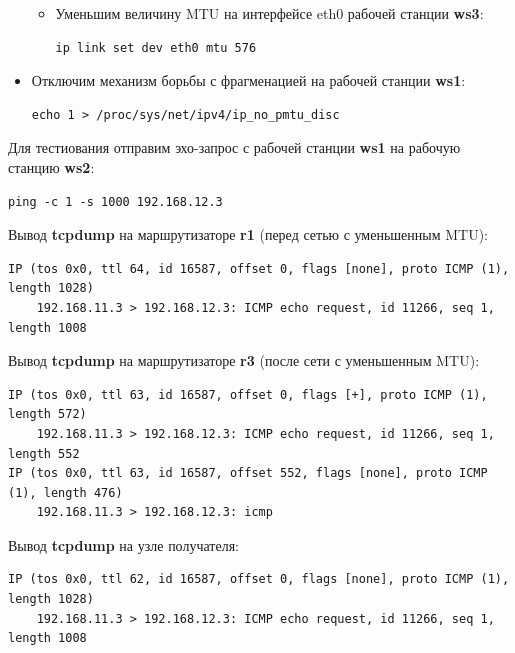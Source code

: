 \documentclass[a4paper,12pt]{article}
\begin{document}
\begin{itemize}
\begin{itemize}
\item Уменьшим величину MTU на интерфейсе eth0 рабочей станции \textbf{ws3}:

\begin{Verbatim}
ip link set dev eth0 mtu 576
\end{Verbatim}

\end{itemize}

\item Отключим механизм борьбы с фрагменацией на рабочей станции \textbf{ws1}:

\begin{Verbatim}
echo 1 > /proc/sys/net/ipv4/ip_no_pmtu_disc
\end{Verbatim}

\end{itemize}

Для тестиования отправим эхо-запрос с рабочей станции \textbf{ws1} на рабочую станцию
\textbf{ws2}:

\begin{Verbatim}
ping -c 1 -s 1000 192.168.12.3
\end{Verbatim}

Вывод \textbf{tcpdump} на маршрутизаторе \textbf{r1} (перед сетью с уменьшенным MTU):

\begin{Verbatim}
IP (tos 0x0, ttl 64, id 16587, offset 0, flags [none], proto ICMP (1), length 1028)
    192.168.11.3 > 192.168.12.3: ICMP echo request, id 11266, seq 1, length 1008
\end{Verbatim}

Вывод \textbf{tcpdump} на маршрутизаторе \textbf{r3} (после сети с уменьшенным MTU):

\begin{Verbatim}
IP (tos 0x0, ttl 63, id 16587, offset 0, flags [+], proto ICMP (1), length 572)
    192.168.11.3 > 192.168.12.3: ICMP echo request, id 11266, seq 1, length 552
IP (tos 0x0, ttl 63, id 16587, offset 552, flags [none], proto ICMP (1), length 476)
    192.168.11.3 > 192.168.12.3: icmp
\end{Verbatim}

Вывод \textbf{tcpdump} на узле получателя:

\begin{Verbatim}
IP (tos 0x0, ttl 62, id 16587, offset 0, flags [none], proto ICMP (1), length 1028)
    192.168.11.3 > 192.168.12.3: ICMP echo request, id 11266, seq 1, length 1008
\end{Verbatim}
\end{document}
